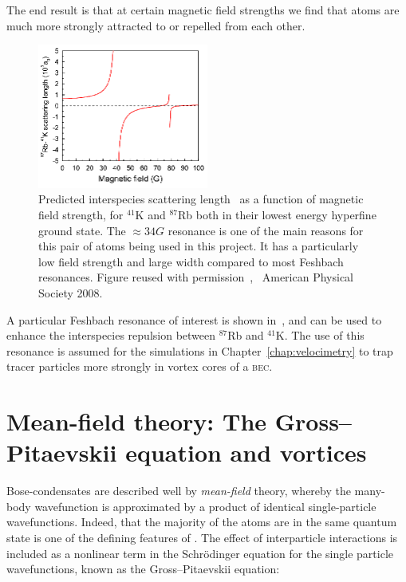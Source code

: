 The end result is that at certain magnetic field strengths we find that atoms are much more strongly attracted to or repelled from each other.

\begin{figure}%
\begin{center}
\includegraphics[width=0.5\textwidth]{figures/unsorted/feshKRb.png}
\caption{Predicted interspecies scattering length~\cite{thalhammer_double_2008} as a function of magnetic field strength, for $^{41}$K and $^{87}$Rb both in their lowest energy hyperfine ground state. The $\approx34\unit{G}$ resonance is one of the main reasons for this pair of atoms being used in this project. It has a particularly low field strength and large width compared to most Feshbach resonances. Figure reused with permission~\cite{thalhammer_double_2008}, \textcopyright~American Physical Society 2008.}\label{fig:feshKRb}
\end{center}
\end{figure}

A particular Feshbach resonance of interest is shown in~, and can be used to enhance the interspecies repulsion between $^{87}$Rb and $^{41}$K. The use of this resonance is assumed for the simulations in Chapter~\ref{chap:velocimetry} to trap tracer particles more strongly in vortex cores of a \textsc{bec}.

\section{Mean-field theory: The Gross--Pitaevskii equation and vortices}\label{sec:mean_field_theory}

Bose-condensates are described well by \emph{mean-field} theory, whereby the many-body wavefunction is approximated by a product of identical single-particle wavefunctions. Indeed, that the majority of the atoms are in the same quantum state is one of the defining features of \bec. The effect of interparticle interactions is included as a nonlinear term in the Schr\"odinger equation for the single particle wavefunctions, known as the Gross--Pitaevskii equation:

